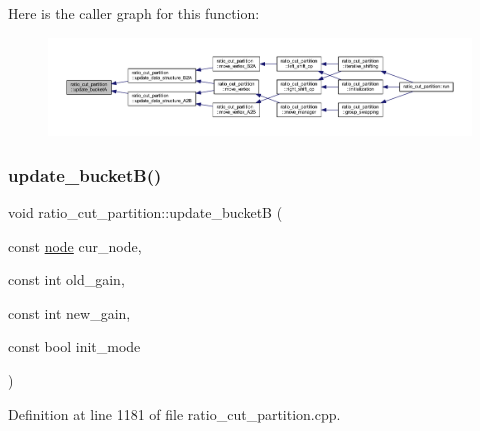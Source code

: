Here is the caller graph for this function\+:\nopagebreak
\begin{figure}[H]
\begin{center}
\leavevmode
\includegraphics[width=350pt]{classratio__cut__partition_acbd0608a7e5560a52c447711cb59a644_icgraph}
\end{center}
\end{figure}
\mbox{\label{classratio__cut__partition_abe5d474e6d99c7bb200071d6484b5358}} 
\subsubsection{\texorpdfstring{update\+\_\+bucket\+B()}{update\_bucketB()}}
{\footnotesize\ttfamily void ratio\+\_\+cut\+\_\+partition\+::update\+\_\+bucketB (\begin{DoxyParamCaption}\item[{const \mbox{\hyperlink{classnode}{node}}}]{cur\+\_\+node,  }\item[{const int}]{old\+\_\+gain,  }\item[{const int}]{new\+\_\+gain,  }\item[{const bool}]{init\+\_\+mode }\end{DoxyParamCaption})\hspace{0.3cm}{\ttfamily [protected]}}



Definition at line 1181 of file ratio\+\_\+cut\+\_\+partition.\+cpp.


